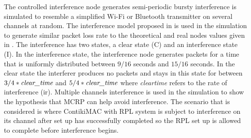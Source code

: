 
The controlled interference node generates semi-periodic bursty interference is simulated to resemble a simplified Wi-Fi or Bluetooth transmitter on several channels at random. The interference model proposed in \cite{interferenceModel} is used in the simulation to generate similar packet loss rate to the theoretical and real nodes values given in \cite{radio2009}. The interference has two states, a clear state (C) and an interference state (I). 
In the interference state, the interference node generates packets for a time that is uniformly distributed between $9/16$ seconds and $15/16$ seconds. In the clear state the interferer produces no packets and stays in this state for between $3/4 * \emph{clear\textunderscore time}$ and $5/4 * \emph{clear\textunderscore time}$ where \emph{clear\textunderscore time} refers to the rate of interference (ir). 
Multiple channels interference is used in the simulation to show the hypothesis that MCRP can help avoid interference. The scenario that is considered is where ContikiMAC with RPL system is subject to interference on its channel after set up has successfully completed so the RPL set up is allowed to complete before interference begins.

